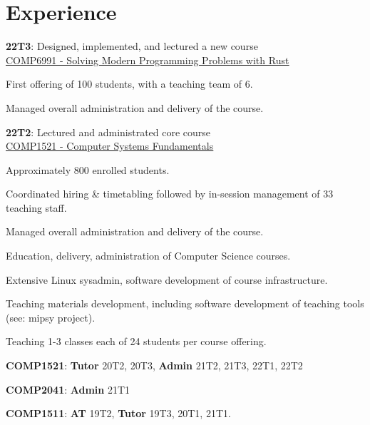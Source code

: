\documentclass[a4paper]{deedy-resume}
\begin{document}
\begin{minipage}[t]{0.66\textwidth}


\section{Experience}


\vspace{\topsep} %
\begin{tightitemize}
\item
	\textbf{22T3}: Designed, implemented, and lectured
	a new course \\
	\href{https://www.handbook.unsw.edu.au/undergraduate/courses/current/COMP6991}
		 {\underline{COMP6991 - Solving Modern Programming Problems with Rust}}
\item First offering of 100 students, with a teaching team of 6.
\item Managed overall administration and delivery of the course.
\item
	\textbf{22T2}: Lectured and administrated core course \\
	\href{https://www.handbook.unsw.edu.au/undergraduate/courses/current/COMP1521}
		 {\underline{COMP1521 - Computer Systems Fundamentals}}
\item Approximately 800 enrolled students.
\item Coordinated hiring \& timetabling followed by
	  in-session management of 33 teaching staff.
\item Managed overall administration and delivery of the course.
\end{tightitemize}

\sectionspace



\begin{tightitemize}
\item Education, delivery, administration of Computer Science courses.
\item Extensive Linux sysadmin,
	  software development of course infrastructure.
\item Teaching materials development, including software
	  development of teaching tools (see: mipsy project).
\item Teaching 1-3 classes each of 24 students per course offering.
\item \textbf{COMP1521}: \textbf{Tutor} 20T2, 20T3,
						 \textbf{Admin} 21T2, 21T3, 22T1, 22T2
\item \textbf{COMP2041}: \textbf{Admin} 21T1
\item \textbf{COMP1511}: \textbf{AT}    19T2,
						 \textbf{Tutor} 19T3, 20T1, 21T1.
\end{tightitemize}


\end{minipage}
\end{document}
